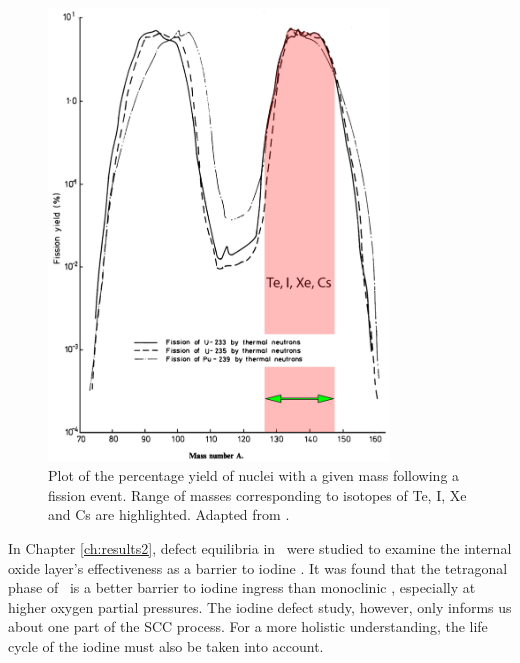 \begin{figure}[ht] %
    \centering
    \includegraphics[height=12cm]{images/fissionyield.png}
    \caption[Plot of the percentage yield of nuclei with a given mass following a fission event. Range of masses corresponding to isotopes of Te, I, Xe and Cs are highlighted.]{Plot of the percentage yield of nuclei with a given mass following a fission event. Range of masses corresponding to isotopes of Te, I, Xe and Cs are highlighted. Adapted from \cite{England1992}.}
    \label{fig:fissionyield}
\end{figure}

In Chapter \ref{ch:results2}, defect equilibria in \zirconia\ were studied to examine the internal oxide layer's effectiveness as a barrier to iodine \cite{kenichiodine2018}. It was found that the tetragonal phase of \zirconia\ is a better barrier to iodine ingress than monoclinic \zirconia , especially at higher oxygen partial pressures. The iodine defect study, however, only informs us about one part of the SCC process. For a more holistic understanding, the life cycle of the iodine must also be taken into account.    


